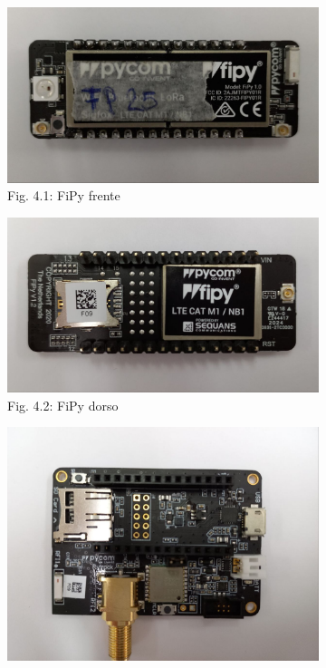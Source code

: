 \documentclass[12pt]{article}
\begin{document}
\begin{figure}[ht]
  \centering
  \begin{subfigure}[b]{0.45\linewidth}
    \includegraphics[width=\linewidth]{images/FiPy-1.jpg}
    \caption{Fig. 4.1: FiPy frente}
    \label{fig:FiPy-fte}
  \end{subfigure}
  \begin{subfigure}[b]{0.45\linewidth}
    \includegraphics[width=\linewidth]{images/FiPy-2.jpg}
    \caption{Fig. 4.2: FiPy dorso}
    \label{fig:FyPy-dor}
  \end{subfigure}
  \centering
  \begin{subfigure}[b]{0.45\linewidth}
    \includegraphics[width=\linewidth]{images/PyTrack-1.jpg}

\end{subfigure}
\end{figure}
\end{document}
